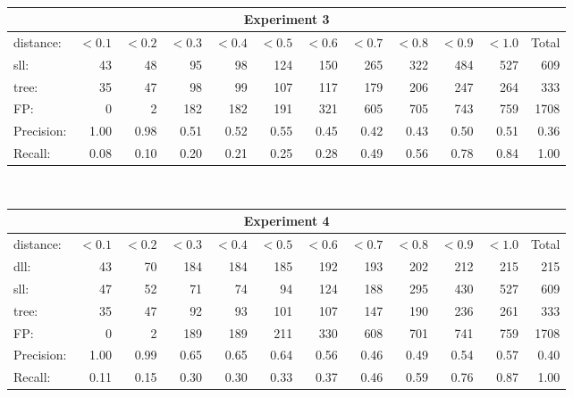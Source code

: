 \documentclass[12pt]{article}
\begin{document}
~

\hspace{-1in}
\begin{tabular}{|l|r|r|r|r|r|r|r|r|r|r|r|}
\hline
\multicolumn{12}{|c|}{Experiment 3} \\
\hline
distance:  & $<0.1$ & $<0.2$ & $<0.3$ & $<0.4$ & $<0.5$ & $<0.6$ & $<0.7$ & $<0.8$ & $<0.9$ & $<1.0$ & Total \\
\hline
sll:       &     43 &     48 &     95 &     98 &    124 &    150 &    265 &    322 &    484 &    527 &   609 \\
tree:      &     35 &     47 &     98 &     99 &    107 &    117 &    179 &    206 &    247 &    264 &   333 \\
FP:        &      0 &      2 &    182 &    182 &    191 &    321 &    605 &    705 &    743 &    759 &  1708 \\
\hline
Precision: &   1.00 &   0.98 &   0.51 &   0.52 &   0.55 &   0.45 &   0.42 &   0.43 &   0.50 &   0.51 &  0.36 \\
Recall:    &   0.08 &   0.10 &   0.20 &   0.21 &   0.25 &   0.28 &   0.49 &   0.56 &   0.78 &   0.84 &  1.00 \\
\hline
\end{tabular}

~

\hspace{-1in}
\begin{tabular}{|l|r|r|r|r|r|r|r|r|r|r|r|}
\hline
\multicolumn{12}{|c|}{Experiment 4} \\
\hline
distance:  & $<0.1$ & $<0.2$ & $<0.3$ & $<0.4$ & $<0.5$ & $<0.6$ & $<0.7$ & $<0.8$ & $<0.9$ & $<1.0$ & Total \\
\hline
dll:       &     43 &     70 &    184 &    184 &    185 &    192 &    193 &    202 &    212 &    215 &   215 \\
sll:       &     47 &     52 &     71 &     74 &     94 &    124 &    188 &    295 &    430 &    527 &   609 \\
tree:      &     35 &     47 &     92 &     93 &    101 &    107 &    147 &    190 &    236 &    261 &   333 \\
FP:        &      0 &      2 &    189 &    189 &    211 &    330 &    608 &    701 &    741 &    759 &  1708 \\
\hline
Precision: &   1.00 &   0.99 &   0.65 &   0.65 &   0.64 &   0.56 &   0.46 &   0.49 &   0.54 &   0.57 &  0.40 \\
Recall:    &   0.11 &   0.15 &   0.30 &   0.30 &   0.33 &   0.37 &   0.46 &   0.59 &   0.76 &   0.87 &  1.00 \\
\hline
\end{tabular}
\end{document}
